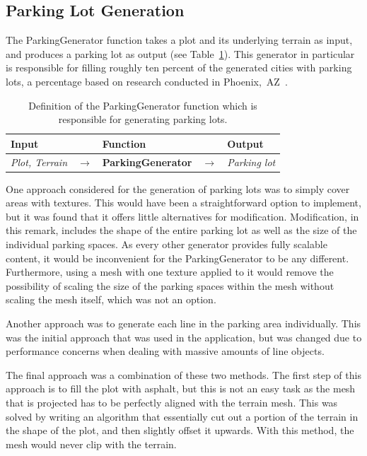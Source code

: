 \subsection{Parking Lot Generation}
The ParkingGenerator function takes a plot and its underlying terrain as input, and produces a parking lot as output (see Table~\ref{table:parking}).
This generator in particular is responsible for filling roughly ten percent of the generated cities with parking lots, a percentage based on research conducted in Phoenix,~AZ~\cite{parking_percent}.

\begin{table}[H]
   \centering
   \begin{tabular}{lllll}
     \textbf{Input}                           &               & \textbf{Function}            &               & \textbf{Output}         \\
     \midrule
     \textit{Plot, Terrain}                   & $\rightarrow$ & \textbf{ParkingGenerator}       & $\rightarrow$ & \textit{Parking lot}           \\
     \bottomrule
   \end{tabular}

   \caption{Definition of the ParkingGenerator function which is responsible for generating parking lots.}
   \label{table:parking}
 \end{table}
 \vspace{-0.4cm}

One approach considered for the generation of parking lots was to simply cover areas with textures.
This would have been a straightforward option to implement, but it was found that it offers little alternatives for modification.
Modification, in this remark, includes the shape of the entire parking lot as well as the size of the individual parking spaces.
As every other generator provides fully scalable content, it would be inconvenient for the ParkingGenerator to be any different.
Furthermore, using a mesh with one texture applied to it would remove the possibility of scaling the size of the parking spaces within the mesh without scaling the mesh itself, which was not an option.

Another approach was to generate each line in the parking area individually. 
This was the initial approach that was used in the application, but was changed due to performance concerns when dealing with massive amounts of line objects.

The final approach was a combination of these two methods.
The first step of this approach is to fill the plot with asphalt, but this is not an easy task as the mesh that is projected has to be perfectly aligned with the terrain mesh.
This was solved by writing an algorithm that essentially cut out a portion of the terrain in the shape of the plot, and then slightly offset it upwards.
With this method, the mesh would never clip with the terrain. 

